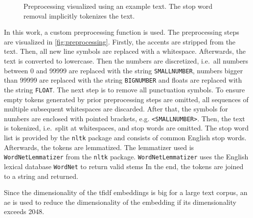 \begin{figure}[!htb] %
    \centering
    
    \caption[Preprocessing]{Preprocessing visualized using an example text.
    The stop word removal implicitly tokenizes the text.}
    \label{fig:preprocessing}
\end{figure}

In this work, a custom preprocessing function is used.
The preprocessing steps are visualized in \autoref{fig:preprocessing}.
Firstly, the accents are stripped from the text.
Then, all new line symbols are replaced with a whitespace.
Afterwards, the text is converted to lowercase.
Then the numbers are discretized, i.e.\ all numbers between 0 and 99999 are replaced with the string \texttt{SMALLNUMBER}, 
numbers bigger than 99999 are replaced with the string \texttt{BIGNUMBER} and floats are replaced with the string \texttt{FLOAT}.
The next step is to remove all punctuation symbols.
To ensure empty tokens generated by prior preprocessing steps are omitted, 
all sequences of multiple subsequent whitespaces are discarded.
After that, the symbols for numbers are enclosed with pointed brackets, e.g. \texttt{<SMALLNUMBER>}.
Then, the text is tokenized, i.e.\ split at whitespaces, and stop words are omitted.
The stop word list is provided by the \texttt{nltk} package 
and consists of common English stop words.
Afterwards, the tokens are lemmatized.
The lemmatizer used is \texttt{WordNetLemmatizer} from the \texttt{nltk} package.
\texttt{WordNetLemmatizer} uses the English lexical database \texttt{WordNet} to return valid stems \cite{nltk-lemma-wordnet}
In the end, the tokens are joined to a string and returned.

Since the dimensionality of the \ac{tfidf} embeddings is big for a large text corpus, 
an \ac{ae} is used to reduce the dimensionality of the embedding if its dimensionality exceeds 2048.